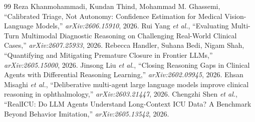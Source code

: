 \documentclass[journal,twoside]{IEEEtran}
\begin{document}
\begin{thebibliography}{99}
 Reza Khanmohammadi, Kundan Thind, Mohammad M. Ghassemi, ``Calibrated Triage, Not Autonomy: Confidence Estimation for Medical Vision-Language Models,'' \emph{arXiv:2606.15910}, 2026.
 Rui Yang \emph{et al.}, ``Evaluating Multi-Turn Multimodal Diagnostic Reasoning on Challenging Real-World Clinical Cases,'' \emph{arXiv:2607.25933}, 2026.
 Rebecca Handler, Suhana Bedi, Nigam Shah, ``Quantifying and Mitigating Premature Closure in Frontier LLMs,'' \emph{arXiv:2605.15000}, 2026.
 Jinsong Liu \emph{et al.}, ``Closing Reasoning Gaps in Clinical Agents with Differential Reasoning Learning,'' \emph{arXiv:2602.09945}, 2026.
 Ehsan Misaghi \emph{et al.}, ``Deliberative multi-agent large language models improve clinical reasoning in ophthalmology,'' \emph{arXiv:2603.21447}, 2026.
 Chengzhi Shen \emph{et al.}, ``RealICU: Do LLM Agents Understand Long-Context ICU Data? A Benchmark Beyond Behavior Imitation,'' \emph{arXiv:2605.13542}, 2026.
\end{thebibliography}
\end{document}
